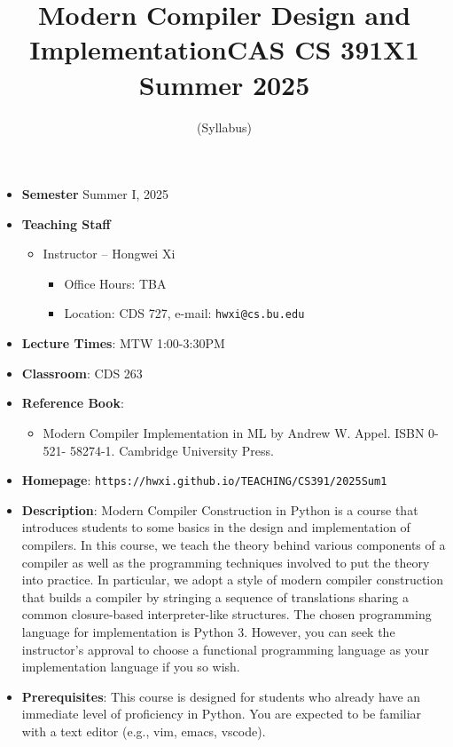 \documentclass[11pt]{article}
\title{Modern Compiler Design and Implementation\break CAS CS 391X1 Summer 2025}
\author{(Syllabus)}
\date{}
\begin{document}
\maketitle
\thispagestyle{empty}

\begin{itemize}
\item
{\bf Semester}
Summer I, 2025
\item
{\bf Teaching Staff}
\begin{itemize}
\item
Instructor -- Hongwei Xi
\begin{itemize}
\item
Office Hours: TBA
\item
Location: CDS 727, e-mail: \texttt{hwxi@cs.bu.edu}
\end{itemize}
\end{itemize}

\item {\bf Lecture Times}: MTW 1:00-3:30PM
\item {\bf Classroom}: CDS 263
\item {\bf Reference Book}:\kern6pt
\begin{itemize}
\item
Modern Compiler Implementation in ML by Andrew W. Appel. ISBN 0-521-
58274-1. Cambridge University Press.
\end{itemize}

\item {\bf Homepage}:
{\tt  https://hwxi.github.io/TEACHING/CS391/2025Sum1}

\item {\bf Description}:
Modern Compiler Construction in Python is a course that introduces
students to some basics in the design and implementation of
compilers. In this course, we teach the theory behind various
components of a compiler as well as the programming techniques
involved to put the theory into practice. In particular, we adopt a
style of modern compiler construction that builds a compiler by
stringing a sequence of translations sharing a common closure-based
interpreter-like structures.  The chosen programming language for
implementation is Python 3. However, you can seek the instructor’s
approval to choose a functional programming language as your
implementation language if you so wish.

\item {\bf Prerequisites}:
This course is designed for students who already have an immediate
level of proficiency in Python. You are expected to be familiar with a
text editor (e.g., vim, emacs, vscode).


\end{itemize}
\end{document}
